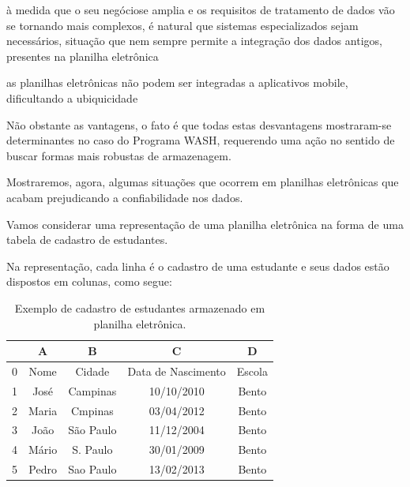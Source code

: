 \documentclass[
12pt,		%
openright,	%
twoside,  %
a4paper,			%
chapter=TITLE,		%
english,			%
french,				%
spanish,			%
brazil				%
]{USPSC-classe/USPSC}
\begin{document}
\begin{alineas}
\item \`a medida que o seu \textquotedbl neg\'ocio\textquotedbl  se amplia e os requisitos de tratamento de dados v\~ao se tornando mais complexos, \'e natural que sistemas especializados sejam necess\'arios, situa\c{c}\~ao que nem sempre permite a integra\c{c}\~ao dos dados antigos, presentes na planilha eletr\^onica
\item as planilhas eletr\^onicas n\~ao podem ser integradas a aplicativos mobile, dificultando a ubiquicidade
\end{alineas}

N\~ao obstante as vantagens, o fato \'e que todas estas desvantagens mostraram-se determinantes no caso do Programa WASH, requerendo uma a\c{c}\~ao no sentido de buscar formas mais robustas de armazenagem.




Mostraremos, agora, algumas situa\c{c}\~oes que ocorrem em planilhas eletr\^onicas que acabam prejudicando a confiabilidade nos dados.




Vamos considerar uma representa\c{c}\~ao de uma planilha eletr\^onica na forma de uma tabela de cadastro de estudantes.




Na representa\c{c}\~ao, cada linha \'e o cadastro de uma estudante e seus dados est\~ao dispostos em colunas, como segue:








\begin{table}[htb]
\tiny
\caption{\label{ddd7a335bbc10f88eaaf4abda266d151f0ba0e6f}Exemplo de cadastro de estudantes armazenado em planilha eletr\^onica.}

\centering
\begin{tabular}{|c|c|c|c|c|}
\hline
  &  A  &  B  &  C  &  D  \\
\hline
0 & Nome  &  Cidade  &  Data de Nascimento  &  Escola \\
1 & Jos\'e  &  Campinas  &  10/10/2010  &  Bento \\
2 & Maria  &  Cmpinas  &  03/04/2012  &  Bento \\
3 & Jo\~ao  &  S\~ao Paulo  &  11/12/2004  &  Bento \\
4 & M\'ario  &  S. Paulo  &  30/01/2009  &  Bento \\
5 & Pedro  &  Sao Paulo  &  13/02/2013  &  Bento \\
\hline
\end{tabular}
\end{table}
\end{document}
